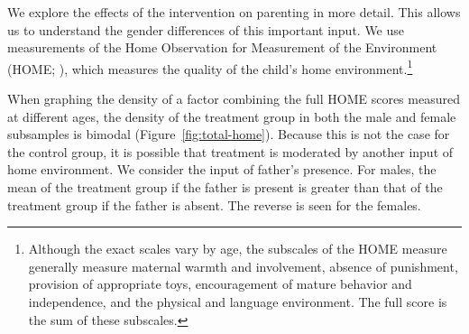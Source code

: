 We explore the effects of the intervention on parenting in more detail. This allows us to understand the gender differences of this important input. We use measurements of the Home Observation for Measurement of the Environment (HOME; \citet{Bradley-Caldwell_1977_AJMD}), which measures the quality of the child's home environment.\footnote{Although the exact scales vary by age, the subscales of the HOME measure generally measure maternal warmth and involvement, absence of punishment, provision of appropriate toys, encouragement of mature behavior and independence, and the physical and language environment. The full score is the sum of these subscales.}

When graphing the density of a factor combining the full HOME scores measured at different ages, the density of the treatment group in both the male and female subsamples is bimodal (Figure~\ref{fig:total-home}). Because this is not the case for the control group, it is possible that treatment is moderated by another input of home environment. We consider the input of father's presence. For males, the mean of the treatment group if the father is present is greater than that of the treatment group if the father is absent. The reverse is seen for the females. 

